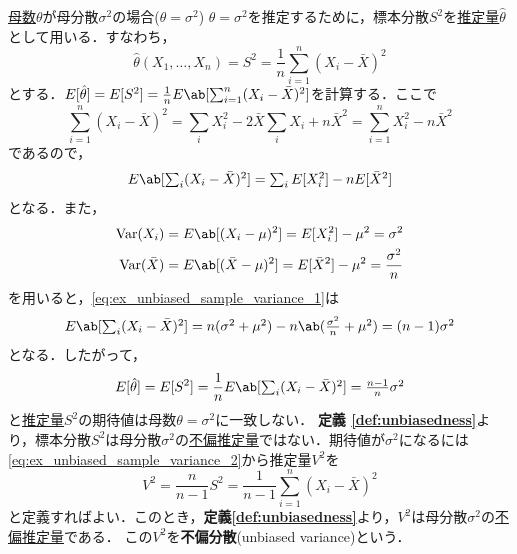 \documentclass[main.tex]{subfiles}
\begin{document}
\begin{myexample}{\hyperlink{def:parameter}{母数}$\theta$が母分散$\sigma^2$の場合($\theta=\sigma^2$)}
\label{ex:unbiased_sample_variance} %
  $\theta=\sigma^2$を推定するために，標本分散$S^2$を\hyperlink{def:estimator}{推定量}$\hat{\theta}$として用いる．すなわち，
  \begin{equation}
    \hat{\theta} (X_1, \dots, X_n) = S^2 = \frac{1}{n} \sum_{i=1}^{n} (X_i - \bar{X})^2
  \end{equation}
とする．$E[\hat{\theta}]=E[S^2]=\frac{1}{n}  E\ab[\sum_{i=1}^{n}(X_i - \bar{X})^2]$を計算する．ここで
\begin{equation}
  \sum_{i=1}^{n} (X_i - \bar{X})^2 = \sum_{i} X_i^2 -2 \bar{X} \sum_{i} X_i + n \bar{X}^2  = \sum_{i=1}^{n} X_i^2 - n\bar{X}^2
\end{equation}
であるので，
\begin{equation}
  E \ab[\textstyle \sum_{i} (X_i - \bar{X})^2] = \sum_{i} E[X_i^2] - n E[\bar{X}^2]
  \label{eq:ex_unbiased_sample_variance_1}
\end{equation}
となる．また，
\begin{equation}
  \begin{split}
  \Var(X_i) &= E \ab[(X_i - \mu)^2] = E[X_i^2] - \mu^2 = \sigma^2 \\
  \Var(\bar{X}) &= E \ab[(\bar{X} - \mu)^2] = E[\bar{X}^2] - \mu^2 = \frac{\sigma^2}{n}
  \end{split}
\end{equation}
を用いると，\eqref{eq:ex_unbiased_sample_variance_1}は
\begin{equation}
  E \ab[\textstyle \sum_{i} (X_i - \bar{X})^2] = n(\sigma^2 + \mu^2) - n\ab(\frac{\sigma^2}{n} + \mu^2) = (n-1)\sigma^2
  \label{eq:ex_unbiased_sample_variance_2}
\end{equation}
となる．したがって，
\begin{equation}
  E[\hat{\theta}] = E[S^2] = \frac{1}{n} E \ab[\textstyle \sum_{i} (X_i - \bar{X})^2] = \frac{n-1}{n} \sigma^2
\end{equation}
と\hyperlink{def:estimator}{推定量}$S^2$の期待値は母数$\theta=\sigma^2$に一致しない．
\textbf{定義 \ref{def:unbiasedness}}より，標本分散$S^2$は母分散$\sigma^2$の\hyperref[def:unbiasedness]{不偏推定量}ではない．期待値が$\sigma^2$になるには\eqref{eq:ex_unbiased_sample_variance_2}から推定量$V^2$を
\begin{equation}
  V^2 = \frac{n}{n-1} S^2 = \frac{1}{n-1} \sum_{i=1}^{n} (X_i - \bar{X})^2
\end{equation}
と定義すればよい．このとき，\textbf{定義\ref{def:unbiasedness}}より，$V^2$は母分散$\sigma^2$の\hyperref[def:unbiasedness]{不偏推定量}である．
この$V^2$を\textbf{不偏分散}(unbiased variance)という．
\end{myexample}
\end{document}
